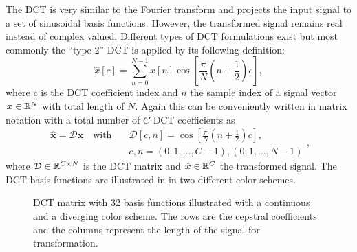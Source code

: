 The DCT is very similar to the Fourier transform and projects the input signal to a set of sinusoidal basis functions. 
However, the transformed signal remains real instead of complex valued.
Different types of DCT formulations exist but most commonly the \enquote{type 2} DCT is applied by its following definition:
\begin{equation}\label{eq:signal_mfcc_dct}
  \hat{x}[c] = \sum_{n=0}^{N-1} x[n] \cos{\left[ \frac{\pi}{N} \left( n + \frac{1}{2} \right) c \right]},
\end{equation}
where $c$ is the DCT coefficient index and $n$ the sample index of a signal vector $\bm{x} \in \mathbb{R}^N$ with total length of $N$.
Again this can be conveniently written in matrix notation with a total number of $C$ DCT coefficients as
\begin{equation}\label{eq:signal_mfcc_dct_matrix}
  \begin{aligned}
    \hat{\bm{x}} = \mathcal{D} \bm{x} \quad \mathrm{with} 
    \quad &\mathcal{D}[c, n] = \cos{\left[ \frac{\pi}{N} \left( n + \frac{1}{2} \right) c  \right]},\\
    &c, n = (0, 1, \dots, C - 1), (0, 1, \dots, N - 1) 
  \end{aligned},
\end{equation}
where $\mathcal{D} \in \mathbb{R}^{C \times N}$ is the DCT matrix and $\hat{\bm{x}} \in \mathbb{R}^C$ the transformed signal.
The DCT basis functions are illustrated in  in two different color schemes.
\begin{figure}[!ht]
  \centering
  \qquad
  \caption{DCT matrix with 32 basis functions illustrated with a continuous and a diverging color scheme. The rows are the cepstral coefficients and the columns represent the length of the signal for transformation.}
  \label{fig:signal_mfcc_dct}
\end{figure}
